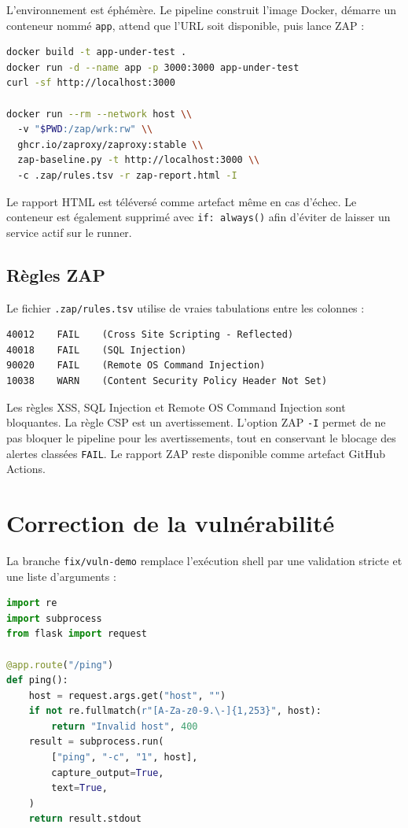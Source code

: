 \documentclass[12pt,a4paper]{article}
\begin{document}
L'environnement est éphémère. Le pipeline construit l'image Docker, démarre un
conteneur nommé \texttt{app}, attend que l'URL soit disponible, puis lance ZAP :
\begin{lstlisting}[language=bash]
docker build -t app-under-test .
docker run -d --name app -p 3000:3000 app-under-test
curl -sf http://localhost:3000

docker run --rm --network host \\
  -v "$PWD:/zap/wrk:rw" \\
  ghcr.io/zaproxy/zaproxy:stable \\
  zap-baseline.py -t http://localhost:3000 \\
  -c .zap/rules.tsv -r zap-report.html -I
\end{lstlisting}

Le rapport HTML est téléversé comme artefact même en cas d'échec. Le conteneur est
également supprimé avec \texttt{if: always()} afin d'éviter de laisser un service
actif sur le runner.

\subsection{Règles ZAP}

Le fichier \texttt{.zap/rules.tsv} utilise de vraies tabulations entre les colonnes :
\begin{lstlisting}[language={}]
40012    FAIL    (Cross Site Scripting - Reflected)
40018    FAIL    (SQL Injection)
90020    FAIL    (Remote OS Command Injection)
10038    WARN    (Content Security Policy Header Not Set)
\end{lstlisting}

Les règles XSS, SQL Injection et Remote OS Command Injection sont bloquantes. La
règle CSP est un avertissement. L'option ZAP \texttt{-I} permet de ne pas bloquer le
pipeline pour les avertissements, tout en conservant le blocage des alertes
classées \texttt{FAIL}. Le rapport ZAP reste disponible comme artefact GitHub Actions.

\section{Correction de la vulnérabilité}

La branche \texttt{fix/vuln-demo} remplace l'exécution shell par une validation stricte
et une liste d'arguments :
\begin{lstlisting}[language=Python]
import re
import subprocess
from flask import request

@app.route("/ping")
def ping():
    host = request.args.get("host", "")
    if not re.fullmatch(r"[A-Za-z0-9.\-]{1,253}", host):
        return "Invalid host", 400
    result = subprocess.run(
        ["ping", "-c", "1", host],
        capture_output=True,
        text=True,
    )
    return result.stdout
\end{lstlisting}
\end{document}
